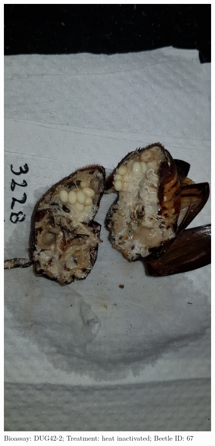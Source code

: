 \documentclass[11pt]{scrartcl}
\begin{document}
\begin{figure}[h!]
    \centering
    \includegraphics[width=\linewidth, height=\textheight, keepaspectratio]{uploads/btl.pm_image.a74f3b6001fab6de.447567343220333232385f5265702d3220284849292e6a7067.jpg}
    \caption{Bioassay: DUG42-2; Treatment: heat inactivated; Beetle ID: 67}
\end{figure}
\clearpage
\end{document}
